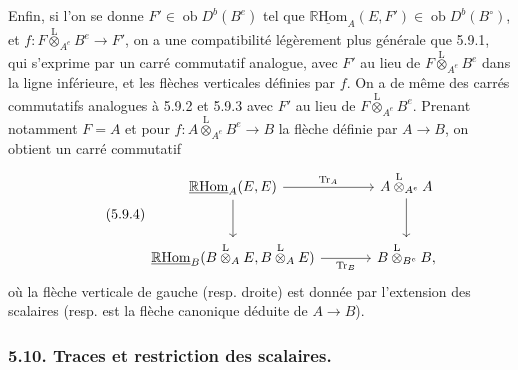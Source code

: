 \documentclass[11pt]{article}
\newcommand{\R}{\mathbb{R}}\newcommand{\RHomCore}{\mathbb{R}\mathrm{Hom}}
\newcommand{\ob}{\operatorname{ob}}
\providecommand{\RHom}{\RHomCore}
\providecommand{\uRHom}{\underline{\RHom}}
\providecommand{\Tr}{\operatorname{Tr}}
\providecommand{\Tr}{\operatorname{Tr}}
\providecommand{\lten}{\overset{\mathrm L}{\otimes}}
\providecommand{\Tr}{\operatorname{Tr}}
\providecommand{\RHom}{\RHomCore}
\providecommand{\ob}{\operatorname{ob}}
\providecommand{\lten}{\overset{\mathrm L}{\otimes}}
\providecommand{\RHom}{\R\mathcal{H}om}
\providecommand{\lten}{\overset{\mathrm L}{\otimes}}
\providecommand{\R}{\mathrm R}
\providecommand{\Tr}{\operatorname{Tr}}
\providecommand{\lten}{\overset{\mathrm L}{\otimes}}
\providecommand{\lten}{\overset{\mathrm L}{\otimes}}
\providecommand{\lten}{\overset{\mathrm L}{\otimes}}
\providecommand{\RHom}{\RHomCore}
\providecommand{\Tr}{\operatorname{Tr}}
\providecommand{\lten}{\overset{\mathrm L}{\otimes}}
\begin{document}
Enfin, si l'on se donne $F'\in\ob D^b(B^e)$ tel que $\uRHom_A(E,F')\in\ob D^b(B^\circ)$, et $f:F\lten_{A^e}B^e\to F'$, on a une compatibilité légèrement plus générale que 5.9.1, qui s'exprime par un carré commutatif analogue, avec $F'$ au lieu de $F\lten_{A^e}B^e$ dans la ligne inférieure, et les flèches verticales définies par $f$. On a de même des carrés commutatifs analogues à 5.9.2 et 5.9.3 avec $F'$ au lieu de $F\lten_{A^e}B^e$. Prenant notamment $F=A$ et pour $f:A\lten_{A^e}B^e\to B$ la flèche définie par $A\to B$, on obtient un carré commutatif
\begin{equation}\tag{5.9.4}
\begin{tikzcd}[column sep=large,row sep=large]
\uRHom_A(E,E) \arrow[r,"\Tr_A"] \arrow[d] & A\lten_{A^e}A \arrow[d]\\
\uRHom_B(B\lten_AE,B\lten_AE) \arrow[r,"\Tr_B"'] & B\lten_{B^e}B,
\end{tikzcd}
\end{equation}
où la flèche verticale de gauche (resp. droite) est donnée par l'extension des scalaires (resp. est la flèche canonique déduite de $A\to B$).

\subsubsection*{5.10. Traces et restriction des scalaires.}
\end{document}
